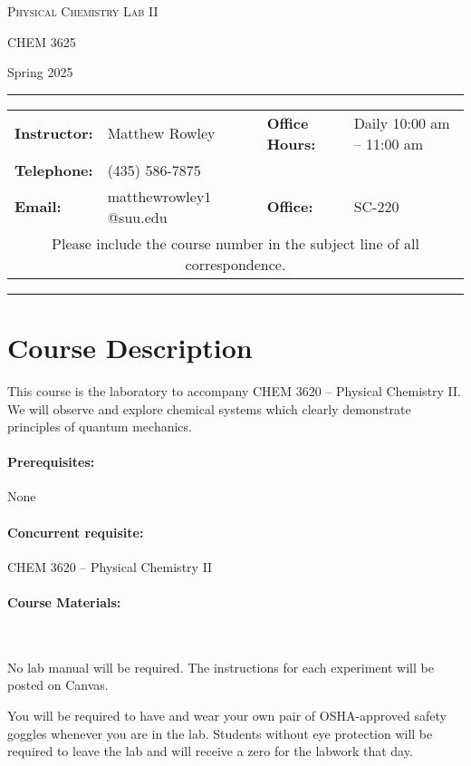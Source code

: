 \documentclass[12pt, letterpaper]{article}
\begin{document}
\begin{center}
	{\Large \textsc{Physical Chemistry Lab II}}

	CHEM 3625
\end{center}

\begin{center}
	{\large Spring 2025}
\end{center}
\begin{center}
	\rule{0.99\textwidth}{0.4pt}
	\begin{tabular}{llcll}
		\textbf{Instructor:} & Matthew Rowley           &  & \textbf{Office Hours:} & Daily 10:00 am -- 11:00 am \\
		\textbf{Telephone:}  & (435) 586-7875           &  &                        &                            \\
		\textbf{Email:}      & matthewrowley$1$@suu.edu &  & \textbf{Office:}       & SC-220                     \\
		\multicolumn{5}{c}{Please include the course number in the subject line of all correspondence.}
	\end{tabular}
	\rule{0.99\textwidth}{0.4pt}
\end{center}

\section*{Course Description}
This course is the laboratory to accompany CHEM 3620 -- Physical Chemistry II. We will observe and explore chemical systems which clearly demonstrate principles of quantum mechanics.

\paragraph{Prerequisites:}
None

\paragraph{Concurrent requisite:}
CHEM 3620 -- Physical Chemistry II

\paragraph{Course Materials:} ~

\noindent No lab manual will be required. The instructions for each experiment will be posted on Canvas.

\noindent You will be required to have and wear your own pair of OSHA-approved safety goggles whenever you are in the lab. Students without eye protection will be required to leave the lab and will receive a zero for the labwork that day.
\end{document}
